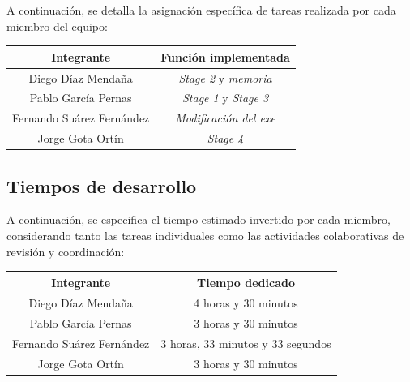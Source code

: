 \documentclass[11pt,a4paper]{article}
\begin{document}
\noindent A continuación, se detalla la asignación específica de tareas realizada por cada miembro del equipo: \vspace{1ex}
\begin{center}
  \renewcommand{\arraystretch}{1.2}
  \begin{tabular}{|c|c|}
    \hline
    \textbf{Integrante}\cellcolor{azulSuave} & \textbf{Función implementada}\cellcolor{azulSuave} \\
    \hline
    Diego Díaz Mendaña & \textit{Stage 2} y \textit{memoria} \\
    Pablo García Pernas & \textit{Stage 1} y \textit{Stage 3} \\
    Fernando Suárez Fernández & \textit{Modificación del exe} \\
    Jorge Gota Ortín & \textit{Stage 4} \\
    \hline
  \end{tabular}
\end{center}
\vspace{3ex}

\subsection{Tiempos de desarrollo}
A continuación, se especifica el tiempo estimado invertido por cada miembro, considerando tanto las tareas individuales como las actividades colaborativas de revisión y coordinación: \vspace{2ex}
\begin{center}
  \renewcommand{\arraystretch}{1.2}
  \begin{tabular}{|c|c|}
    \hline
    \textbf{Integrante}\cellcolor{azulSuave} & \textbf{Tiempo dedicado}\cellcolor{azulSuave} \\
    \hline
    Diego Díaz Mendaña & 4 horas y 30 minutos \\
    Pablo García Pernas & 3 horas y 30 minutos \\
    Fernando Suárez Fernández & 3 horas, 33 minutos y 33 segundos \\
    Jorge Gota Ortín & 3 horas y 30 minutos\\
    \hline
  \end{tabular}
\end{center}
\end{document}
